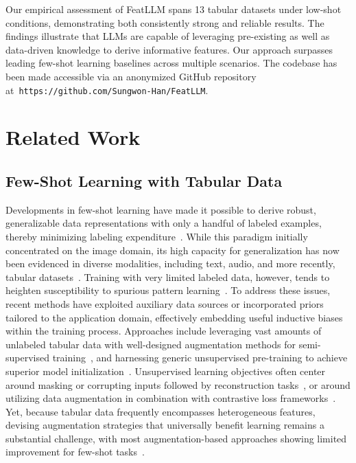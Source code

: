 Our empirical assessment of \textsf{FeatLLM} spans 13 tabular datasets under low-shot conditions, demonstrating both consistently strong and reliable results. The findings illustrate that LLMs are capable of leveraging pre-existing as well as data-driven knowledge to derive informative features. Our approach surpasses leading few-shot learning baselines across multiple scenarios. The codebase has been made accessible via an anonymized GitHub repository at~\texttt{https://github.com/Sungwon-Han/FeatLLM}.

\section{Related Work}

\subsection{Few-Shot Learning with Tabular Data} Developments in few-shot learning have made it possible to derive robust, generalizable data representations with only a handful of labeled examples, thereby minimizing labeling expenditure~\cite{chen2018closer}. While this paradigm initially concentrated on the image domain, its high capacity for generalization has now been evidenced in diverse modalities, including text, audio, and more recently, tabular datasets~\cite{majumder2022few,nam2023stunt,schick2021exploiting}. Training with very limited labeled data, however, tends to heighten susceptibility to spurious pattern learning~\cite{bartlett2021deep}. To address these issues, recent methods have exploited auxiliary data sources or incorporated priors tailored to the application domain, effectively embedding useful inductive biases within the training process. Approaches include leveraging vast amounts of unlabeled tabular data with well-designed augmentation methods for semi-supervised training~\cite{ucar2021subtab,yoon2020vime}, and harnessing generic unsupervised pre-training to achieve superior model initialization~\cite{somepalli2021saint}. Unsupervised learning objectives often center around masking or corrupting inputs followed by reconstruction tasks~\cite{arik2021tabnet,majmundar2022met}, or around utilizing data augmentation in combination with contrastive loss frameworks~\cite{bahri2022scarf,chen2020simple}. Yet, because tabular data frequently encompasses heterogeneous features, devising augmentation strategies that universally benefit learning remains a substantial challenge, with most augmentation-based approaches showing limited improvement for few-shot tasks~\cite{nam2023stunt}.

